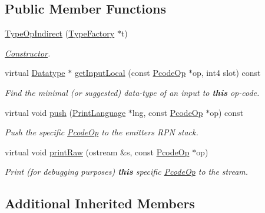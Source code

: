 \subsection*{Public Member Functions}
\begin{DoxyCompactItemize}
\item 
\mbox{\hyperlink{class_type_op_indirect_a37fc44cced41547f3430c42687dcaa45}{Type\+Op\+Indirect}} (\mbox{\hyperlink{class_type_factory}{Type\+Factory}} $\ast$t)
\begin{DoxyCompactList}\small\item\em \mbox{\hyperlink{class_constructor}{Constructor}}. \end{DoxyCompactList}\item 
virtual \mbox{\hyperlink{class_datatype}{Datatype}} $\ast$ \mbox{\hyperlink{class_type_op_indirect_a556bb0789c0ef43a825befed5f4068c4}{get\+Input\+Local}} (const \mbox{\hyperlink{class_pcode_op}{Pcode\+Op}} $\ast$op, int4 slot) const
\begin{DoxyCompactList}\small\item\em Find the minimal (or suggested) data-\/type of an input to {\bfseries{this}} op-\/code. \end{DoxyCompactList}\item 
virtual void \mbox{\hyperlink{class_type_op_indirect_a6c1d09459f194501368fd07d9fccc124}{push}} (\mbox{\hyperlink{class_print_language}{Print\+Language}} $\ast$lng, const \mbox{\hyperlink{class_pcode_op}{Pcode\+Op}} $\ast$op) const
\begin{DoxyCompactList}\small\item\em Push the specific \mbox{\hyperlink{class_pcode_op}{Pcode\+Op}} to the emitter\textquotesingle{}s R\+PN stack. \end{DoxyCompactList}\item 
virtual void \mbox{\hyperlink{class_type_op_indirect_a26e28dde9299bf0eb6ba5277ea7000c0}{print\+Raw}} (ostream \&s, const \mbox{\hyperlink{class_pcode_op}{Pcode\+Op}} $\ast$op)
\begin{DoxyCompactList}\small\item\em Print (for debugging purposes) {\bfseries{this}} specific \mbox{\hyperlink{class_pcode_op}{Pcode\+Op}} to the stream. \end{DoxyCompactList}\end{DoxyCompactItemize}
\subsection*{Additional Inherited Members}


